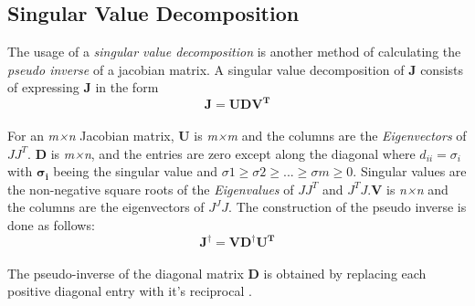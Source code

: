 \subsection{Singular Value Decomposition}
The usage of a \textit{singular value decomposition} is another method of calculating the \textit{pseudo inverse} of a jacobian matrix. A singular value decomposition of \textbf{J} consists of expressing \textbf{J} in the form\\
\begin{equation}
\pmb{J} = \pmb{UDV^{T}}
\end{equation} 
\\For an \textit{m×n} Jacobian matrix, \textbf{U} is\textit{ m×m} and the columns are the \textit{Eigenvectors} of $JJ^{T}$. \textbf{D} is \textit{m×n}, and the entries are zero except along the diagonal where $d_{ii}=\sigma_{i}$ with $\pmb{\sigma_{i}}$ beeing the singular value and $\sigma 1\geq \sigma 2 \geq ...\geq \sigma m \geq 0$. Singular values are the non-negative square roots of the \textit{Eigenvalues} of $JJ^{T}$ and $ J^{T}J$.\textbf{V} is \textit{n×n} and the columns are the eigenvectors of $J^{J}J$.
The construction of the pseudo inverse is done as follows:\\
\begin{equation}
\pmb{J}^{\dagger} = \pmb{VD^{\dagger}U^{T}}
\end{equation} 
\\The pseudo-inverse of the diagonal matrix \textbf{D} is obtained by replacing each positive diagonal entry with it's reciprocal \cite{Golub.1965}.
